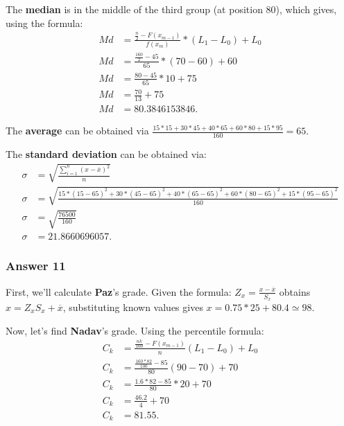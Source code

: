 \documentclass[11pt]{article}
\begin{document}
The \textbf{median} is in the middle of the third group (at position 80), which
gives, using the formula:
\begin{equation*}
  \begin{aligned}
    Md &= \frac{\frac{n}{2} - F(x_{m-1})}{f(x_m)} * (L_1-L_0)+L_0 \\
    Md &= \frac{\frac{160}{2} - 45}{65} * (70 - 60) + 60 \\
    Md &= \frac{80 - 45}{65} * 10 + 75 \\
    Md &= \frac{70}{13} + 75 \\
    Md &= 80.3846153846.
  \end{aligned}
\end{equation*}

The \textbf{average} can be obtained via $\frac{15*15+30*45+40*65+60*80+15*95}{160}=65$.

The \textbf{standard deviation} can be obtained via:
\begin{equation*}
  \begin{aligned}
    \sigma &= \sqrt{\frac{\sum_{i=1}^n (x-\overline{x})^2}{n}} \\
    \sigma &= \sqrt{\frac{15 * (15 - 65)^2 + 30 * (45 - 65)^2 +
        40 * (65 - 65)^2 + 60 * (80 - 65)^2 + 15 * (95 - 65)^2}{160}} \\
    \sigma &= \sqrt{\frac{76500}{160}} \\
    \sigma &= 21.8660696057.
  \end{aligned}
\end{equation*}
\subsubsection{Answer 11}
\label{sec-1-3-3}
First, we'll calculate \textbf{Paz}'s grade.  Given the formula:
$Z_x=\frac{x-\overline{x}}{S_x}$ obtains $x=Z_xS_x + \overline{x}$,
substituting known values gives $x=0.75 * 25 + 80.4 \simeq 98$.

Now, let's find \textbf{Nadav}'s grade.  Using the percentile formula:
\begin{equation*}
  \begin{aligned}
    C_k &= \frac{\frac{nk}{100} - F(x_{m-1})}{n}(L_1 - L_0) + L_0 \\
    C_k &= \frac{\frac{160*82}{100} - 85}{80}(90 - 70) + 70 \\
    C_k &= \frac{1.6*82 - 85}{80} * 20 + 70 \\
    C_k &= \frac{46.2}{4} + 70 \\
    C_k &= 81.55.
  \end{aligned}
\end{equation*}
\end{document}
